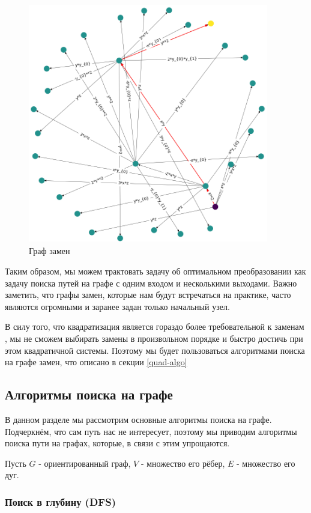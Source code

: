 \begin{figure}
\includegraphics[width=10.5cm,height=10.5cm]{chapters/images/replacement_graph.png} 
\caption{Граф замен}
\label{fig:replacement-graph}
\end{figure}

Таким образом, мы можем трактовать задачу об оптимальном преобразовании как задачу поиска путей на графе с одним входом и несколькими выходами. Важно заметить, что графы замен, которые нам будут встречаться на практике, часто являются огромными и заранее задан только начальный узел.

В силу того, что квадратизация является гораздо более требовательной к заменам \cite{Gu-PhD}, мы не сможем выбирать замены в произвольном порядке и быстро достичь при этом квадратичной системы. Поэтому мы будет пользоваться алгоритмами поиска на графе замен, что описано в секции \ref{quad-algo}

\subsection{Алгоритмы поиска на графе} \label{search-algo}

В данном разделе мы рассмотрим основные алгоритмы поиска на графе. Подчеркнём, что сам путь нас не интересует, поэтому мы приводим алгоритмы поиска пути на графах, которые, в связи с этим упрощаются.

Пусть $G$ - ориентированный граф, $V$ - множество его рёбер, $E$ - множество его дуг.

\subsubsection{Поиск в глубину (DFS)} \label{DFS-algo}


